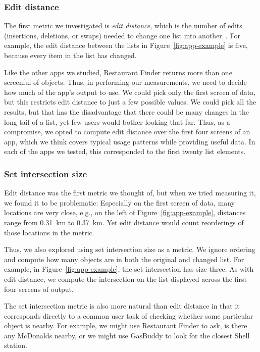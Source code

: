 \subsubsection{Edit distance}

The first metric we investigated is \emph{edit distance}, which is the
number of edits (insertions, deletions, or swaps) needed to change one
list into another~\cite{levenshtein:1966}. For
example, the edit distance between the lists in
Figure~\ref{fig:app-example} is five, because every item in the
list has changed.

Like the other apps we studied, Restaurant Finder returns more than
one screenful of objects. Thus, in performing our measurements, we
need to decide how much of the app's output to use. We could pick only
the first screen of data, but this restricts edit distance to just
a few possible values. We could pick all the results, but that has the
disadvantage that there could be many changes in the long tail of a
list, yet few users would bother looking that far. Thus, as a
compromise, we opted to compute edit distance over the first four
screens of an app, which we think covers typical usage patterns while
providing useful data.  In each of the apps we tested, this corresponded 
to the first twenty list elements.

\subsubsection{Set intersection size}

Edit distance was the first metric we thought of, but when we tried
measuring it, we found it to be
problematic: Especially on the first screen of data, many locations
are very close, e.g., on the left of
Figure~\ref{fig:app-example}, distances range from 0.31~km to
0.37~km. Yet edit distance would count reorderings of those locations
in the metric.

Thus, we also explored using set intersection size as a metric. We
ignore ordering and compute how many objects are in both the original
and changed list. For example, in Figure~\ref{fig:app-example}, the set
intersection has size three. As with edit distance, we compute the
intersection on the list displayed across the first four screens of
output.

The set intersection metric is also more natural than edit distance in
that it corresponds directly to a common user task of checking whether
some particular object is nearby. For example, we might use Restaurant Finder
to ask, is there any McDonalds nearby, or we might use GasBuddy to
look for the closest Shell station.

